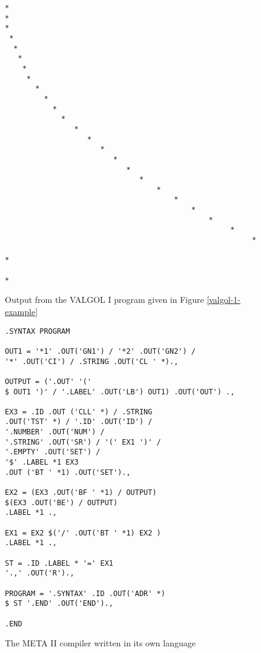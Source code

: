 \documentclass[notitlepage,twocolumn]{report}
\begin{document}
\begin{figure}
\caption{Output from the VALGOL I program given in Figure \ref{valgol-1-example}}
\begin{verbatim}
*
*
*
 *
  *
   *
    *
     *
       *
         *
           *
             *
                *
                   *
                      *
                         *
                            *
                               *
                                   *
                                       *
                                           *
                                               *
                                                    *
                                                         *
                                                              *
                                                                   *
\end{verbatim}
\end{figure}


\begin{figure}
\caption{The META II compiler written in its own language}
\begin{verbatim}
.SYNTAX PROGRAM

OUT1 = '*1' .OUT('GN1') / '*2' .OUT('GN2') /
'*' .OUT('CI') / .STRING .OUT('CL ' *).,

OUTPUT = ('.OUT' '('
$ OUT1 ')' / '.LABEL' .OUT('LB') OUT1) .OUT('OUT') .,

EX3 = .ID .OUT ('CLL' *) / .STRING
.OUT('TST' *) / '.ID' .OUT('ID') /
'.NUMBER' .OUT('NUM') /
'.STRING' .OUT('SR') / '(' EX1 ')' /
'.EMPTY' .OUT('SET') /
'$' .LABEL *1 EX3
.OUT ('BT ' *1) .OUT('SET').,

EX2 = (EX3 .OUT('BF ' *1) / OUTPUT)
$(EX3 .OUT('BE') / OUTPUT)
.LABEL *1 .,

EX1 = EX2 $('/' .OUT('BT ' *1) EX2 )
.LABEL *1 .,

ST = .ID .LABEL * '=' EX1
'.,' .OUT('R').,

PROGRAM = '.SYNTAX' .ID .OUT('ADR' *)
$ ST '.END' .OUT('END').,

.END
\end{verbatim}
\end{figure}
\end{document}
